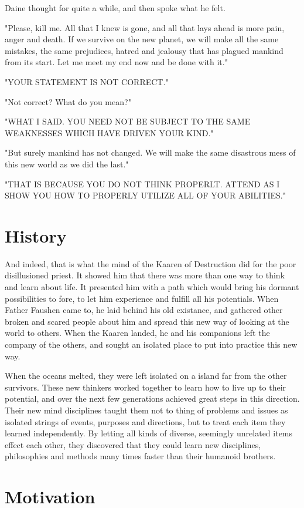 \begin{multicols*}{2}
Daine thought for quite a while, and then spoke what he felt.

"Please, kill me. All that I knew is gone, and all that lays ahead is more pain, anger and death. If we survive on the new planet, we will make all the same mistakes, the same prejudices, hatred and jealousy that has plagued mankind from its start. Let me meet my end now and be done with it."

"YOUR STATEMENT IS NOT CORRECT."

"Not correct? What do you mean?"

"WHAT I SAID. YOU NEED NOT BE SUBJECT TO THE SAME WEAKNESSES WHICH HAVE DRIVEN YOUR KIND."

"But surely mankind has not changed. We will make the same disastrous mess of this new world as we did the last."

"THAT IS BECAUSE YOU DO NOT THINK PROPERLT. ATTEND AS I SHOW YOU HOW TO PROPERLY UTILIZE ALL OF YOUR ABILITIES."

\section{History}

And indeed, that is what the mind of the Kaaren of Destruction did for the poor disillusioned priest. It showed him that there was more than one way to think and learn about life. It presented him with a path which would bring his dormant possibilities to fore, to let him experience and fulfill all his potentials. When Father Faushen came to, he laid behind his old existance, and gathered other broken and scared people about him and spread this new way of looking at the world to others. When the Kaaren landed, he and his companions left the company of the others, and sought an isolated place to put into practice this new way.

When the oceans melted, they were left isolated on a island far from the other survivors. These new thinkers worked together to learn how to live up to their potential, and over the next few generations achieved great steps in this direction. Their new mind disciplines taught them not to thing of problems and issues as isolated strings of events, purposes and directions, but to treat each item they learned independently. By letting all kinds of diverse, seemingly unrelated items effect each other, they discovered that they could learn new disciplines, philosophies and methods many times faster than their humanoid brothers.

\section{Motivation}


\end{multicols*}
